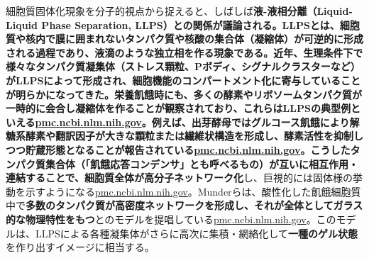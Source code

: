 細胞質固体化現象を分子的視点から捉えると、しばしば\textbf{液-液相分離（Liquid-Liquid Phase Separation, LLPS）\textbf{との関係が議論される。LLPSとは、細胞質や核内で膜に囲まれないタンパク質や核酸の集合体（凝縮体）が可逆的に形成される過程であり、液滴のような独立相を作る現象である。近年、生理条件下で様々なタンパク質凝集体（ストレス顆粒、Pボディ、シグナルクラスターなど）がLLPSによって形成され、細胞機能のコンパートメント化に寄与していることが明らかになってきた。栄養飢餓時にも、多くの酵素やリボソームタンパク質が一時的に会合し凝縮体を作ることが観察されており、これらはLLPSの典型例といえる\href{https://pmc.ncbi.nlm.nih.gov/articles/PMC6857596/\#:~:text=shown\%20to\%20introduce\%20structural\%20changes,2016}{pmc.ncbi.nlm.nih.gov}。例えば、出芽酵母ではグルコース飢餓により解糖系酵素や翻訳因子が大きな顆粒または繊維状構造を形成し、酵素活性を抑制しつつ貯蔵形態となることが報告されている\href{https://pmc.ncbi.nlm.nih.gov/articles/PMC6857596/\#:~:text=shown\%20to\%20introduce\%20structural\%20changes,2016}{pmc.ncbi.nlm.nih.gov}。こうしたタンパク質集合体（}「飢餓応答コンデンサ」\textbf{とも呼べるもの）が互いに相互作用・連結することで、細胞質全体が}高分子ネットワーク化}し、巨視的には固体様の挙動を示すようになる\href{https://pmc.ncbi.nlm.nih.gov/articles/PMC4850707/\#:~:text=match\%20at\%20L1536\%20agreement\%20with,have\%20to\%20determine\%20the\%20molecular}{pmc.ncbi.nlm.nih.gov}。Munderらは、酸性化した飢餓細胞質中で\textbf{多数のタンパク質が高密度ネットワークを形成し、それが全体としてガラス的な物理特性をもつ}とのモデルを提唱している\href{https://pmc.ncbi.nlm.nih.gov/articles/PMC4850707/\#:~:text=match\%20at\%20L1536\%20agreement\%20with,have\%20to\%20determine\%20the\%20molecular}{pmc.ncbi.nlm.nih.gov}。このモデルは、LLPSによる各種凝集体がさらに高次に集積・網絡化して\textbf{一種のゲル状態}を作り出すイメージに相当する。

